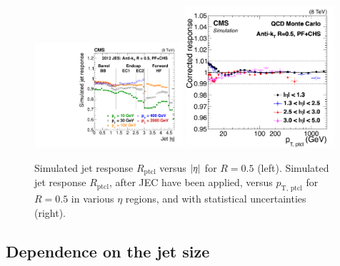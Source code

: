 \documentclass[11pt,twoside,a4paper,cmspaper,final,collab]{cms-tdr}
\begin{document}
\begin{figure}[htbp!]
\centering
\includegraphics[width=0.49\textwidth]{Figure_010-a.pdf}
\includegraphics[width=0.49\textwidth]{Figure_010-b.pdf}
\caption{\label{fig:response}
Simulated jet response $R_\mathrm{ptcl}$ versus $\lvert \eta \rvert$ for $R=0.5$ (left).
Simulated jet response $R_\mathrm{ptcl}$, after JEC have been applied, versus $p_\text{T, ptcl}$ for $R=0.5$ in various $\eta$ regions, and with statistical uncertainties (right).
}
\end{figure}

\subsection{Dependence on the jet size}
\end{document}
